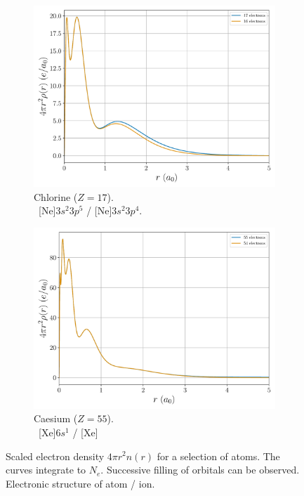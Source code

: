 \documentclass[a4paper,DIV=12,english]{scrartcl}
\begin{document}
\begin{figure}
\begin{subfigure}{0.49\textwidth}
        \label{subfig:wf10}
    \end{subfigure}
    \begin{subfigure}{0.49\textwidth}
        \centering
        \includegraphics[width=\textwidth]{../plots/density/density_17.pdf}
        \caption{Chlorine ($Z=17$). \\ \ [Ne]$3s^2 3p^5$ / [Ne]$3s^2 3p^4$.}
        \label{subfig:wf17}
    \end{subfigure}
    \begin{subfigure}{0.49\textwidth}
        \centering
        \includegraphics[width=\textwidth]{../plots/density/density_55.pdf}
        \caption{Caesium ($Z=55$). \\ \ [Xe]$6s^1 $ / [Xe]}
        \label{subfig:wf55}
    \end{subfigure}
    \caption{Scaled electron density $4\pi r^2 n(r)$ for a selection of atoms. The curves integrate to $N_e$. Successive filling of orbitals can be observed. Electronic structure of atom / ion.}
    \label{fig:wfs}
\end{figure}
\end{document}
